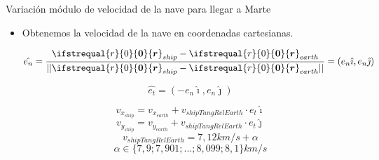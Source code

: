 \documentclass{beamer}
\renewcommand\vec[1]{\ifstrequal{#1}{0}{\ensuremath{\mathbf{0}}}{\ensuremath{\boldsymbol{#1}}}}
\begin{document}
            \begin{frame}{Variación módulo de velocidad de la nave para llegar a Marte}
                \begin{itemize}
                    \item Obtenemos la velocidad de la nave en coordenadas cartesianas.
                    \begin{minipage}[t]{0.55\textwidth}
                        \begin{equation*}
                            \hat{e_n} = \frac{\vec{r}_{ship} - \vec{r}_{earth}}{||\vec{r}_{ship} - \vec{r}_{earth}||}= (e_n \hat{\imath}, e_n \hat{\jmath})
                        \end{equation*}
                    \end{minipage}
                    \hfill
                    \begin{minipage}[t]{0.3\textwidth}
                        \begin{equation*}
                            \hat{e_t} = (-e_n \hat{\imath}, e_n \hat{\jmath})
                        \end{equation*}
                    \end{minipage}
                    \begin{equation*}
                        v_{x_{ship}} = v_{x_{earth}} + v_{shipTangRelEarth} \cdot e_t \hat{\imath}
                    \end{equation*}
                    \begin{equation*}
                        v_{y_{ship}} = v_{y_{earth}} +v_{shipTangRelEarth} \cdot e_t \hat{\jmath}
                    \end{equation*}
                    \begin{equation*}
                        v_{shipTangRelEarth} = 7,12km/s + \alpha
                    \end{equation*}
                    \begin{equation*}
                        \alpha \in \{7,9;7,901;...;8,099;8,1\}km/s
                    \end{equation*}
                \end{itemize}
            \end{frame}
\end{document}
